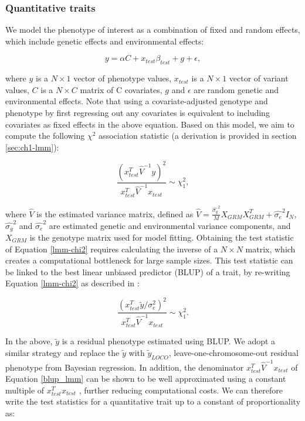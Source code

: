 \subsubsection{Quantitative traits} 
%
We model the phenotype of interest as a combination of fixed and random effects, which include genetic effects and environmental effects:
%

\begin{equation}
    y = \alpha C + x_{test}\beta_{test} + g + \epsilon, \label{eq:lin_lmm}
\end{equation}

%
where $y$ is a $N \times 1$ vector of phenotype values, $x_{test}$ is a $N \times 1$ vector of variant values, $C$ is a $N \times C$ matrix of C covariates, $g$ and $\epsilon$ are random genetic and environmental effects.
%
Note that using a covariate-adjusted genotype and phenotype by first regressing out any covariates is equivalent to including covariates as fixed effects in the above equation.
%
Based on this model, we aim to compute the following $\chi^2$ association statistic (a derivation is provided in section \ref{sec:ch1-lmm}): 
%

\begin{equation}
   \frac{(x_{test}^T \hat{V}^{-1} y)^2}{x_{test}^T \hat{V}^{-1} x_{test}} \sim \chi^2_1, \label{lmm-chi2}
\end{equation}

where $\hat{V}$ is the estimated variance matrix, defined as $\hat{V} = \frac{\hat{\sigma_g}^2}{M} X_{GRM}X_{GRM}^T + \hat{\sigma_e}^2 I_N$, $\hat{\sigma_g}^2$ and $\hat{\sigma_e}^2$ are estimated genetic and environmental variance components, and $X_{GRM}$ is the genotype matrix used for model fitting.
%
Obtaining the test statistic of Equation \ref{lmm-chi2} requires calculating the inverse of a $N \times N$ matrix, which creates a computational bottleneck for large sample sizes.
%
This test statistic can be linked to the best linear unbiased predictor (BLUP) of a trait, by re-writing Equation \ref{lmm-chi2} as described in \cite{loh2015efficient}:
%

\begin{equation}
    \frac{(x_{test}^T \tilde{y}/\sigma_e^2)^2}{x_{test}^T \hat{V}^{-1} x_{test}} \sim \chi^2_1.
    \label{blup_lmm}
\end{equation}

%
In the above, $\tilde{y}$ is a residual phenotype estimated using BLUP.
%
We adopt a similar strategy and replace the $\tilde{y}$ with $\tilde{y}_{LOCO}$, leave-one-chromosome-out residual phenotype from Bayesian regression.
%
In addition, the denominator $x_{test}^T \hat{V}^{-1} x_{test}$ of Equation \ref{blup_lmm} can be shown to be well approximated using a constant multiple of $x_{test}^T x_{test}$ \cite{svishcheva2012rapid}, further reducing computational costs.
%
We can therefore write the test statistics for a quantitative trait up to a constant of proportionality as:
%

